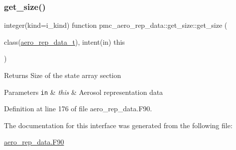 \subsubsection{\texorpdfstring{get\+\_\+size()}{get\_size()}}
{\footnotesize\ttfamily integer(kind=i\+\_\+kind) function pmc\+\_\+aero\+\_\+rep\+\_\+data\+::get\+\_\+size\+::get\+\_\+size (\begin{DoxyParamCaption}\item[{class(\mbox{\hyperlink{structpmc__aero__rep__data_1_1aero__rep__data__t}{aero\+\_\+rep\+\_\+data\+\_\+t}}), intent(in)}]{this }\end{DoxyParamCaption})\hspace{0.3cm}{\ttfamily [private]}}

\begin{DoxyReturn}{Returns}
Size of the state array section
\end{DoxyReturn}

\begin{DoxyParams}[1]{Parameters}
\mbox{\tt in}  & {\em this} & Aerosol representation data \\
\hline
\end{DoxyParams}


Definition at line 176 of file aero\+\_\+rep\+\_\+data.\+F90.



The documentation for this interface was generated from the following file\+:\begin{DoxyCompactItemize}
\item 
\mbox{\hyperlink{aero__rep__data_8_f90}{aero\+\_\+rep\+\_\+data.\+F90}}\end{DoxyCompactItemize}
